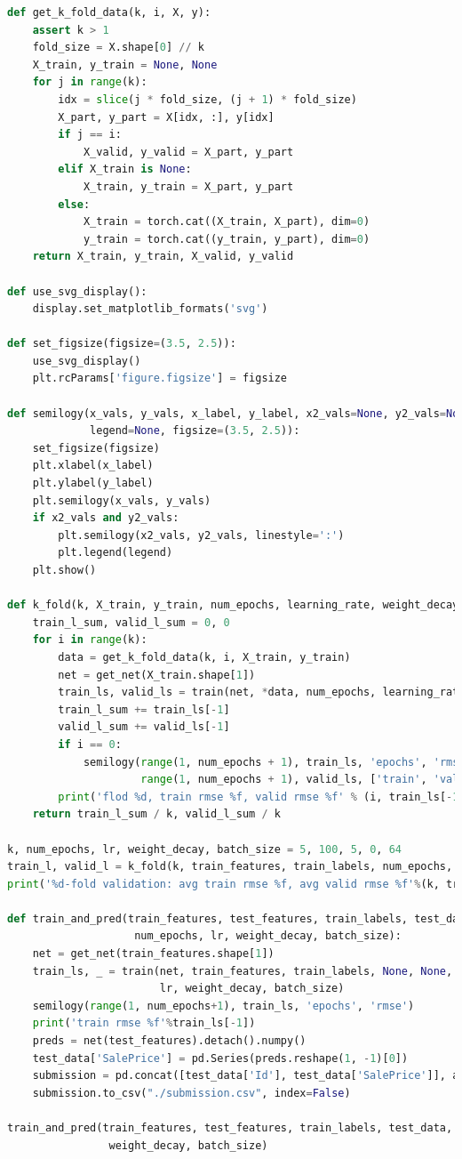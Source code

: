\documentclass[a4paper,12pt]{article}
\begin{document}
\begin{lstlisting}[language=Python]
def get_k_fold_data(k, i, X, y):
	assert k > 1
	fold_size = X.shape[0] // k
	X_train, y_train = None, None
	for j in range(k):
		idx = slice(j * fold_size, (j + 1) * fold_size)
		X_part, y_part = X[idx, :], y[idx]
		if j == i:
			X_valid, y_valid = X_part, y_part
		elif X_train is None:
			X_train, y_train = X_part, y_part
		else:
			X_train = torch.cat((X_train, X_part), dim=0)
			y_train = torch.cat((y_train, y_part), dim=0)
	return X_train, y_train, X_valid, y_valid
	
def use_svg_display():
	display.set_matplotlib_formats('svg')
	
def set_figsize(figsize=(3.5, 2.5)):
	use_svg_display()
	plt.rcParams['figure.figsize'] = figsize
	
def semilogy(x_vals, y_vals, x_label, y_label, x2_vals=None, y2_vals=None, 
			 legend=None, figsize=(3.5, 2.5)):
	set_figsize(figsize)
	plt.xlabel(x_label)
	plt.ylabel(y_label)
	plt.semilogy(x_vals, y_vals)
	if x2_vals and y2_vals:
		plt.semilogy(x2_vals, y2_vals, linestyle=':')
		plt.legend(legend)
	plt.show()
	
def k_fold(k, X_train, y_train, num_epochs, learning_rate, weight_decay, batch_size):
	train_l_sum, valid_l_sum = 0, 0
	for i in range(k):
		data = get_k_fold_data(k, i, X_train, y_train)
		net = get_net(X_train.shape[1])
		train_ls, valid_ls = train(net, *data, num_epochs, learning_rate, weight_decay, batch_size)
		train_l_sum += train_ls[-1]
		valid_l_sum += valid_ls[-1]
		if i == 0:
			semilogy(range(1, num_epochs + 1), train_ls, 'epochs', 'rmse', 
					 range(1, num_epochs + 1), valid_ls, ['train', 'valid'])
		print('flod %d, train rmse %f, valid rmse %f' % (i, train_ls[-1], valid_ls[-1]))
	return train_l_sum / k, valid_l_sum / k

k, num_epochs, lr, weight_decay, batch_size = 5, 100, 5, 0, 64
train_l, valid_l = k_fold(k, train_features, train_labels, num_epochs, lr, weight_decay, batch_size)
print('%d-fold validation: avg train rmse %f, avg valid rmse %f'%(k, train_l, valid_l))

def train_and_pred(train_features, test_features, train_labels, test_data, 
					num_epochs, lr, weight_decay, batch_size):
	net = get_net(train_features.shape[1])
	train_ls, _ = train(net, train_features, train_labels, None, None, num_epochs,
						lr, weight_decay, batch_size)
	semilogy(range(1, num_epochs+1), train_ls, 'epochs', 'rmse')
	print('train rmse %f'%train_ls[-1])
	preds = net(test_features).detach().numpy()
	test_data['SalePrice'] = pd.Series(preds.reshape(1, -1)[0])
	submission = pd.concat([test_data['Id'], test_data['SalePrice']], axis=1)
	submission.to_csv("./submission.csv", index=False)
	
train_and_pred(train_features, test_features, train_labels, test_data, num_epochs, lr, 
				weight_decay, batch_size)
\end{lstlisting}
\end{document}
